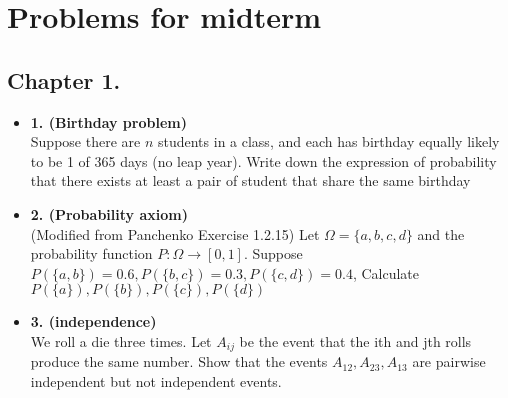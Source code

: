 \documentclass[12pt]{article}
\begin{document}
\section*{Problems for midterm}
\subsection*{Chapter 1.}
\begin{itemize}
    \item \textbf{1. (Birthday problem)}\\
    Suppose there are \(n\) students in a class, and each has birthday equally likely to be 1 of 365 days (no leap year). 
    Write down the expression of probability that there exists at least a pair of student that share the same birthday\    
    \item \textbf{2. (Probability axiom)}\\
    (Modified from Panchenko Exercise 1.2.15)
Let \(\Omega  = \{a,b,c,d\}\) and the probability function \(P: \Omega \to [0,1]\). 
Suppose \(P(\{a,b\}) = 0.6, P(\{b,c\}) = 0.3, P(\{c,d\}) = 0.4\), Calculate \(P(\{a\}), P(\{b\}), P(\{c\}), P(\{d\})\)
    \item \textbf{3. (independence)}\\
We roll a die three times. Let \(A_{ij}\) be the event that the ith and jth rolls produce the same number. 
Show that the events \(A_{12}, A_{23}, A_{13}\) are pairwise independent but not independent events.
\end{itemize}
\end{document}
